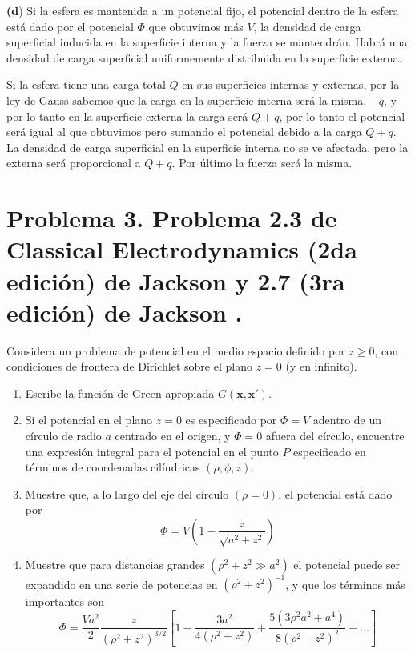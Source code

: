 \documentclass[a4paper,10pt]{article}
\numberwithin{equation}{section}
\begin{document}
\vspace{.3cm}

\textbf{(d}) Si la esfera es mantenida a un potencial fijo, el potencial dentro de 
la esfera está dado por el potencial $\Phi$ que obtuvimos más $V$, la densidad de 
carga superficial inducida en la superficie interna y la fuerza se mantendrán. Habrá 
una densidad de carga superficial uniformemente distribuida en la superficie 
externa.

\vspace{.3cm}

Si la esfera tiene una carga total $Q$ en sus superficies internas y externas, 
por la ley de Gauss sabemos que la carga en la superficie interna será la misma, 
$-q$, y por lo tanto en la superficie externa la carga será $Q+q$, por lo tanto 
el potencial será igual al que obtuvimos pero sumando el potencial debido a la 
carga $Q+q$. La densidad de carga superficial en la superficie interna no se ve 
afectada, pero la externa será proporcional a $Q+q$. Por último la fuerza será 
la misma.

\section{Problema 3. Problema 2.3 de Classical Electrodynamics (2da edición) de Jackson 
\cite{jackson2} y 2.7 (3ra edición) de Jackson \cite{jackson3}.}

Considera un problema de potencial en el medio espacio definido por $z \geq 0$, con 
condiciones de frontera de Dirichlet sobre el plano $z = 0$ (y en infinito).

\begin{enumerate}[label=\textbf{(\alph*)}]
 \item Escribe la función de Green apropiada $G(\mathbf{x},\mathbf{x}')$.
 \item Si el potencial en el plano $z = 0$ es especificado por $\Phi = V$ adentro de un círculo 
 de radio $a$ centrado en el origen, y $\Phi = 0$ afuera del círculo, encuentre 
 una expresión integral para el potencial en el punto $P$ especificado en términos 
 de coordenadas cilíndricas $(\rho,\phi,z)$.
 \item Muestre que, a lo largo del eje del círculo $(\rho = 0)$, el potencial está 
 dado por 
 $$
 \Phi = V\left(1 - \frac{z}{\sqrt{a^2+z^2}}\right)
 $$
 \item Muestre que para distancias grandes $(\rho^2 + z^2 \gg a^2)$ el potencial 
 puede ser expandido en una serie de potencias en $(\rho^2 + z^2)^{-1}$, y que 
 los términos más importantes son 
 $$
 \Phi = \frac{Va^2}{2}\frac{z}{(\rho^2 + z^2)^{3/2}}\left[1 - 
 \frac{3a^2}{4(\rho^2 + z^2)} + \frac{5(3\rho^2a^2+a^4)}{8(\rho^2 + z^2)^2} 
 + \dots \right]
 $$
\end{enumerate}
\end{document}
